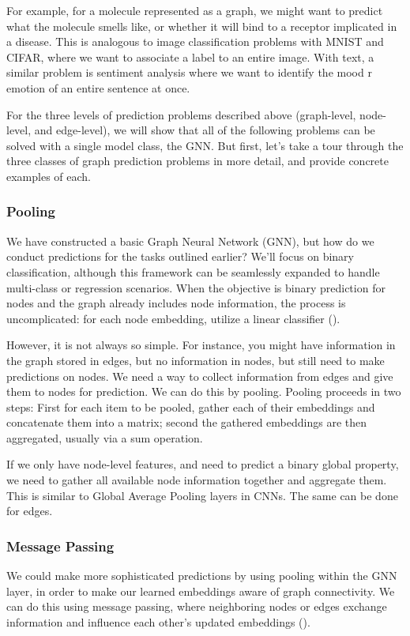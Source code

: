 \documentclass[binding=0.6cm]{sapthesis}
\newcommand{\mycite}[1]{(\cite{#1})}
\begin{document}
For example, for a molecule represented as a graph, we might want to predict what the molecule smells like, or whether it will bind to a receptor implicated in a disease. This is analogous to image classification problems with MNIST and CIFAR,  where we want to associate a label to an entire image. With text, a similar problem is sentiment analysis where we want to identify the mood  r emotion of an entire sentence at once.

For the three levels of prediction problems described above (graph-level, node-level, and edge-level), we will show that all of the following problems can be solved with a single model class, the GNN. But first, let’s take a tour through the three classes of graph prediction problems in more detail, and provide concrete examples of each.


\subsubsection{Pooling}
\label{sec:bg.gnn.graph-pooling}
We have constructed a basic Graph Neural Network (GNN), but how do we conduct predictions for the tasks outlined earlier? We'll focus on binary classification, although this framework can be seamlessly expanded to handle multi-class or regression scenarios. When the objective is binary prediction for nodes and the graph already includes node information, the process is uncomplicated: for each node embedding, utilize a linear classifier \mycite{daigavane2021-conv-on-graphs}. 

However, it is not always so simple. For instance, you might have information in the graph stored in edges, but no information in nodes, but still need to make predictions on nodes. We need a way to collect information from edges and give them to nodes for prediction. We can do this by pooling. Pooling proceeds in two steps: First for each item to be pooled, gather each of their embeddings and concatenate them into a matrix; second the gathered embeddings are then aggregated, usually via a sum operation.

If we only have node-level features, and need to predict a binary global property, we need to gather all available node information together and aggregate them. This is similar to Global Average Pooling layers in CNNs. The same can be done for edges.

\subsubsection{Message Passing}
\label{sec:bg.gnn.message-passing}
We could make more sophisticated predictions by using pooling within the GNN layer, in order to make our learned embeddings aware of graph connectivity. We can do this using message passing, where neighboring nodes or edges exchange information and influence each other’s updated embeddings \mycite{gilmer2017-message-passing}.
\end{document}
